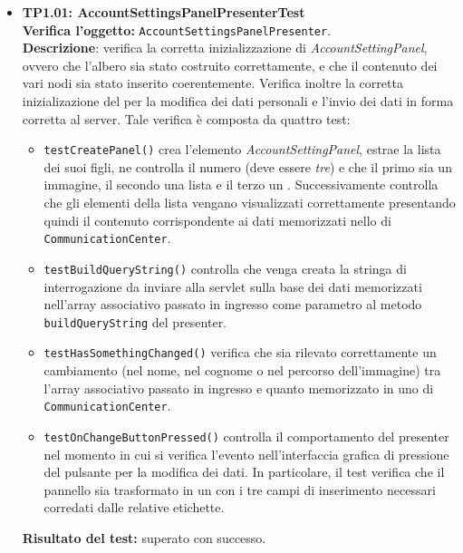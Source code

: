 \begin{itemize}
\item \textbf{TP1.01: AccountSettingsPanelPresenterTest}\\
\textbf{Verifica l'oggetto:} \texttt{AccountSettingsPanelPresenter}.\\
\textbf{Descrizione}: verifica la corretta inizializzazione di \textit{AccountSettingPanel}, ovvero che l'albero sia stato costruito correttamente, e che il contenuto dei vari nodi sia stato inserito coerentemente. Verifica inoltre la corretta inizializazione del  per la modifica dei dati personali e l'invio dei dati in forma corretta al server.
Tale verifica è composta da quattro test:
\begin{itemize}
\item \texttt{testCreatePanel()} crea l'elemento \textit{AccountSettingPanel}, estrae la lista dei suoi figli, ne controlla il numero (deve essere \textit{tre}) e che il primo sia un immagine, il secondo una lista e il terzo un .
Successivamente controlla che gli elementi della lista vengano visualizzati correttamente presentando quindi il contenuto corrispondente ai dati memorizzati nello  di \texttt{CommunicationCenter}.
\item \texttt{testBuildQueryString()} controlla che venga creata la stringa di interrogazione da inviare alla servlet sulla base dei dati memorizzati nell'array associativo passato in ingresso come parametro al metodo \texttt{buildQueryString} del presenter.
\item \texttt{testHasSomethingChanged()} verifica che sia rilevato correttamente un cambiamento (nel nome, nel cognome o nel percorso dell'immagine) tra l'array associativo passato in ingresso e quanto memorizzato in uno  di \texttt{CommunicationCenter}.
\item \texttt{testOnChangeButtonPressed()} controlla il comportamento del presenter nel momento in cui si verifica l'evento nell'interfaccia grafica di pressione del pulsante per la modifica dei dati. In particolare, il test verifica che il pannello sia trasformato in un  con i tre campi di inserimento necessari corredati dalle relative etichette.
\end{itemize}
\textbf{Risultato del test:} superato con successo.


\end{itemize}
